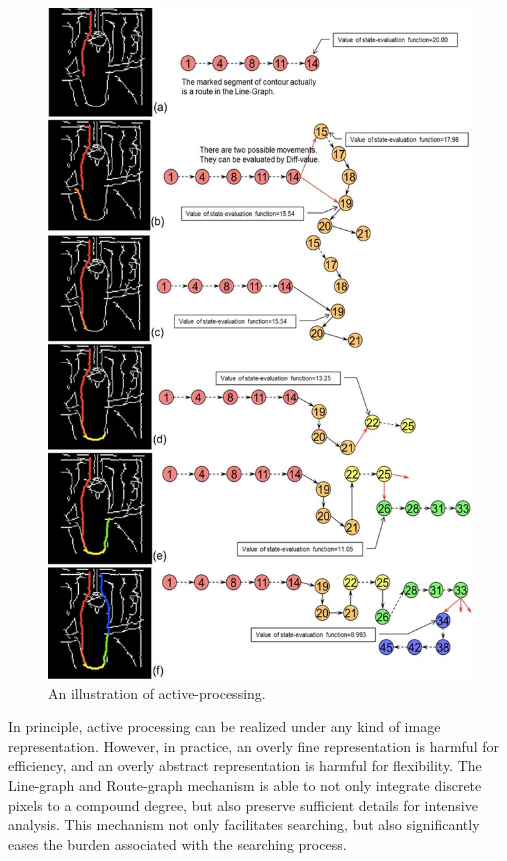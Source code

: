 \documentclass[journal]{IEEEtran}
\begin{document}
\begin{figure}[!t]
\centering
\includegraphics[width=0.98\linewidth]{images/fig23.jpg}
\caption{An illustration of active-processing.}
\label{fig:23}
\end{figure}

In principle, active processing can be realized under any kind of image representation. 
However, in practice, an overly fine representation is harmful for efficiency, 
and an overly abstract representation is harmful for flexibility. 
The Line-graph and Route-graph mechanism is able to not only integrate discrete pixels to a compound degree, 
but also preserve sufficient details for intensive analysis. 
This mechanism not only facilitates searching, 
but also significantly eases the burden associated with the searching process.
\end{document}
